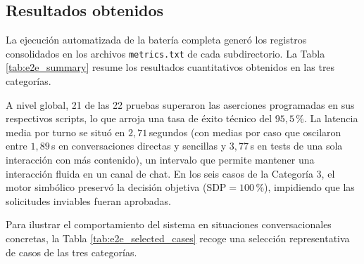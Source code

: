 \documentclass[12pt,a4paper]{report}
\begin{document}
\subsection{Resultados obtenidos}

La ejecución automatizada de la batería completa generó los registros consolidados en los archivos \texttt{metrics.txt} de cada subdirectorio. La Tabla \ref{tab:e2e_summary} resume los resultados cuantitativos obtenidos en las tres categorías.

\begin{table}[htbp]
\centering
\small
{}
\caption{Resumen cuantitativo de la batería de pruebas integradas de extremo a extremo.}
\label{tab:e2e_summary}
\end{table}

A nivel global, 21 de las 22 pruebas superaron las aserciones programadas en sus respectivos scripts, lo que arroja una tasa de éxito técnico del $95{,}5\,$\%. La latencia media por turno se situó en $2{,}71$\,segundos (con medias por caso que oscilaron entre $1{,}89$\,s en conversaciones directas y sencillas y $3{,}77$\,s en tests de una sola interacción con más contenido), un intervalo que permite mantener una interacción fluida en un canal de chat. En los seis casos de la Categoría 3, el motor simbólico preservó la decisión objetiva ($\text{SDP} = 100\,$\%), impidiendo que las solicitudes inviables fueran aprobadas.

Para ilustrar el comportamiento del sistema en situaciones conversacionales concretas, la Tabla \ref{tab:e2e_selected_cases} recoge una selección representativa de casos de las tres categorías.
\end{document}
